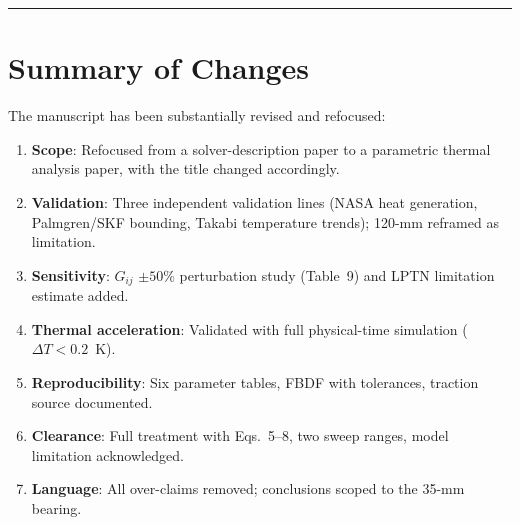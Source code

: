 \documentclass[11pt]{article}
\begin{document}
\bigskip
\noindent\rule{\textwidth}{0.4pt}
\section*{Summary of Changes}

The manuscript has been substantially revised and refocused:
\begin{enumerate}[nosep]
    \item \textbf{Scope}: Refocused from a solver-description paper to a parametric thermal analysis paper, with the title changed accordingly.
    \item \textbf{Validation}: Three independent validation lines (NASA heat generation, Palmgren/SKF bounding, Takabi temperature trends); 120-mm reframed as limitation.
    \item \textbf{Sensitivity}: $G_{ij}$ $\pm 50\%$ perturbation study (Table~9) and LPTN limitation estimate added.
    \item \textbf{Thermal acceleration}: Validated with full physical-time simulation ($\Delta T < 0.2$~K).
    \item \textbf{Reproducibility}: Six parameter tables, FBDF with tolerances, traction source documented.
    \item \textbf{Clearance}: Full treatment with Eqs.~5--8, two sweep ranges, model limitation acknowledged.
    \item \textbf{Language}: All over-claims removed; conclusions scoped to the 35-mm bearing.
\end{enumerate}
\end{document}
